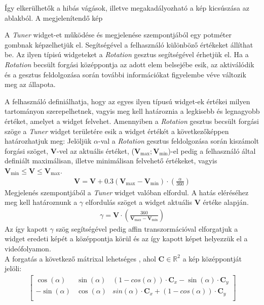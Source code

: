 Így elkerülhetők a hibás vágások, illetve megakadályozható a kép kicsúszása az ablakból.
A megjelenítendő kép


A \textit{Tuner} widget-et működése és megjelenése szempontjából egy potméter gombnak képzelhetjük el. Segítségével a felhasználó különböző értékeket állíthat be.
Az ilyen típisú widgeteket a \textit{Rotation} gesztus segítségével érhetjük el. Ha a \textit{Rotation} becsült forgási középpontja az adott elem belsejébe esik, az aktiválódik és a gesztus feldolgozása során további információkat figyelembe véve változik meg az állapota.

A felhasználó definiálhatja, hogy az egyes ilyen típusú widget-ek értékei milyen tartományon szerepelhetnek, vagyis meg kell határoznia a legkisebb és legnagyobb értéket, amelyet a widget felvehet. Amennyiben a \textit{Rotation} gesztus becsült forgási szöge a \textit{Tuner} widget területére esik a widget értékét a következőképpen határozhatjuk meg:
Jelöljük $\alpha$-val a \textit{Rotation} gesztus feldolgozása során kiszámolt forgási szöget, $\boldsymbol V$-vel az aktuális értéket, ($\boldsymbol V_{\max}; \boldsymbol V_{\min}$)-el pedig a felhasználó által definiált maximálisan, illetve minimálisan felvehető értékeket, vagyis $\boldsymbol V_{\min} \leq \boldsymbol V \leq \boldsymbol V_{\max}$.
\begin{align*}
	\boldsymbol V = \boldsymbol V + 0.3\left(\boldsymbol V_{\max} - \boldsymbol V_{\min}\right) \cdot \left( \frac{\alpha}{360}\right)
\end{align*}
Megjelenés szempontjából a \textit{Tuner} widget valóban elfordul. A hatás eléréséhez meg kell határoznunk a $\gamma$ elfordulás szöget a widget aktuális $\boldsymbol V$ értéke alapján.
\begin{align*}
	\gamma = \boldsymbol V \cdot \left(\frac{360}{\boldsymbol V_{\max} - \boldsymbol V_{\min}}\right)
\end{align*}
Az így kapott $\gamma$ szög segítségével pedig affin transzormációval elforgatjuk a widget eredeti képét a középpontja körül és az így kapott képet helyezzük el a videófolyamon.\\
A forgatás a következő mátrixal lehetséges \cite{bradski2008learning}, ahol $\boldsymbol C \in \mathbb{R}^2$ a kép középpontját jelöli:
\begin{align*}
	\begin{bmatrix}
		\cos(\alpha) & \sin(\alpha) & (1-cos(\alpha))\cdot \boldsymbol C_x-\sin(\alpha)\cdot \boldsymbol C_y\\
		-\sin(\alpha) & \cos(\alpha) & sin(\alpha)\cdot \boldsymbol C_x+(1-cos(\alpha))\cdot \boldsymbol C_y\\
	\end{bmatrix}
\end{align*}
